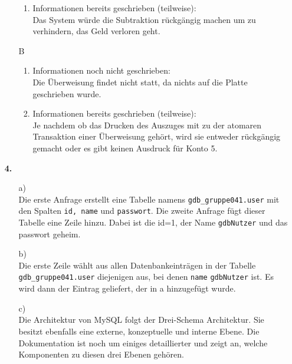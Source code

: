 \documentclass[a4paper,11pt,fleqn]{scrartcl}
\begin{document}
\begin{enumerate}
\begin{enumerate}
\begin{enumerate}
                    \item Informationen bereits geschrieben (teilweise): \\
                        Das System würde die Subtraktion rückgängig machen um zu verhindern, das Geld verloren geht. \\
                \end{enumerate}
                \item[B]
                \begin{enumerate}
                    \item Informationen noch nicht geschrieben: \\
                        Die Überweisung findet nicht statt, da nichts auf die Platte geschrieben wurde. \\
                    \item Informationen bereits geschrieben (teilweise): \\
                        Je nachdem ob das Drucken des Auszuges mit zu der atomaren Transaktion einer Überweisung gehört, wird 
                        sie entweder rückgängig gemacht oder es gibt keinen Ausdruck für Konto 5.\\
                \end{enumerate}
            \end{enumerate}
        \item[\textbf{4.}]
        \begin{enumerate}
            \item[a)]\quad \\
            Die erste Anfrage erstellt eine Tabelle namens \texttt{gdb\_gruppe041.user} mit den 
            Spalten \texttt{id, name} und \texttt{passwort}. Die zweite Anfrage fügt dieser 
            Tabelle eine Zeile hinzu. Dabei ist die id=1, der Name \texttt{gdbNutzer} und das 
            passwort \glqq geheim\grqq. 
            \item[b)]\quad \\
            Die erste Zeile wählt aus allen Datenbankeinträgen in der Tabelle 
            \texttt{gdb\_gruppe041.user} diejenigen aus, bei denen \texttt{name} \texttt{gdbNutzer} ist. 
            Es wird dann der Eintrag geliefert, der in a hinzugefügt wurde. 
            \item[c)]\quad \\
            Die Architektur von MySQL folgt der Drei-Schema Architektur. Sie besitzt ebenfalls 
            eine externe, konzeptuelle und interne Ebene. Die Dokumentation ist noch um einiges 
            detaillierter und zeigt an, welche Komponenten zu diesen drei Ebenen gehören.
        \end{enumerate}
    \end{enumerate}
\end{document}
